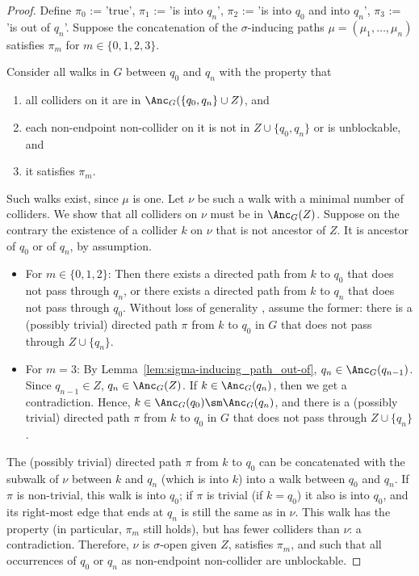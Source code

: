 \begin{proof}
  Define $\pi_0$ := 'true', $\pi_1$ := 'is into $q_n$', $\pi_2$ := 'is into $q_0$ and into $q_n$', $\pi_3$ := 'is out of $q_n$'.
  Suppose the concatenation of the $\sigma$-inducing paths $\mu = (\mu_1, \dots, \mu_n)$ satisfies $\pi_m$ for $m \in \{0,1,2,3\}$.

  Consider all walks in $G$ between $q_0$ and $q_n$ with the property that 
  \begin{enumerate}
    \item all colliders on it are in $\Anc_{G}({\{q_0,q_n\} \cup Z})$, and 
    \item each non-endpoint non-collider on it is not in $Z \cup \{q_0,q_n\}$ or is unblockable, and
    \item it satisfies $\pi_m$.
  \end{enumerate}
  Such walks exist, since $\mu$ is one. 
  Let $\nu$ be such a walk with a minimal number of colliders.
  We show that all colliders on $\nu$ must be in $\Anc_{G}(Z)$. 
  Suppose on the contrary the existence of a collider $k$ on $\nu$ that is not ancestor of $Z$. 
  It is ancestor of $q_0$ or of $q_n$, by assumption.

  \begin{itemize}
    \item For $m\in \{0,1,2\}$:
      Then there exists a directed path from $k$ to $q_0$ that does not pass through $q_n$, or there exists a directed path from $k$ to $q_n$ that does not pass through $q_0$.
      Without loss of generality , assume the former:
      there is a (possibly trivial) directed path $\pi$ from $k$ to $q_0$ in $G$ that does not pass through $Z \cup \{q_n\}$.
    \item For $m = 3$:
      By Lemma~\ref{lem:sigma-inducing_path_out-of}, $q_n \in \Anc_G(q_{n-1})$.
      Since $q_{n-1} \in Z$, $q_n \in \Anc_G(Z)$. 
      If $k \in \Anc_G(q_n)$, then we get a contradiction.
      Hence, $k \in \Anc_G(q_0) \sm \Anc_G(q_n)$, and
      there is a (possibly trivial) directed path $\pi$ from $k$ to $q_0$ in $G$ that does not pass through $Z \cup \{q_n\}$.
  \end{itemize}
  
  The (possibly trivial) directed path $\pi$ from $k$ to $q_0$ can be concatenated with the subwalk of $\nu$ between $k$ and $q_n$ (which is into $k$) into a walk between $q_0$ and $q_n$.
  If $\pi$ is non-trivial, this walk is into $q_0$; if $\pi$ is trivial (if $k = q_0$) it also is into $q_0$, and its right-most edge that ends at $q_n$ is still the same as in $\nu$.
  This walk has the property (in particular, $\pi_m$ still holds), but has fewer colliders than $\nu$: a contradiction.
  Therefore, $\nu$ is $\sigma$-open given $Z$, satisfies $\pi_m$, and such that all occurrences of $q_0$ or $q_n$ as non-endpoint non-collider are unblockable.
\end{proof}

